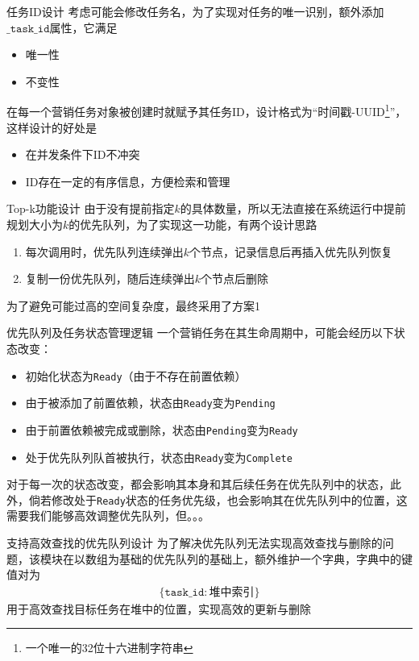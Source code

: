 \documentclass[aspectratio=169]{beamer}
\begin{document}
\begin{frame}{任务ID设计}
    考虑可能会修改任务名，为了实现对任务的唯一识别，额外添加$\mathtt{\_task\_id}$属性，它满足
    \begin{itemize}
        \item 唯一性
        \item 不变性
    \end{itemize}
    在每一个营销任务对象被创建时就赋予其任务ID，设计格式为“时间戳-UUID\footnote{一个唯一的32位十六进制字符串}”，这样设计的好处是
    \begin{itemize}
        \item 在并发条件下ID不冲突
        \item ID存在一定的有序信息，方便检索和管理
    \end{itemize}
\end{frame}

\begin{frame}{Top-k功能设计}
    由于没有提前指定$k$的具体数量，所以无法直接在系统运行中提前规划大小为$k$的优先队列，为了实现这一功能，有两个设计思路
    \begin{enumerate}
        \item 每次调用时，优先队列连续弹出$k$个节点，记录信息后再插入优先队列恢复
        \item 复制一份优先队列，随后连续弹出$k$个节点后删除
    \end{enumerate}
    为了避免可能过高的空间复杂度，最终采用了方案1
\end{frame}

\begin{frame}{优先队列及任务状态管理逻辑}
    一个营销任务在其生命周期中，可能会经历以下状态改变：
    \begin{itemize}
        \item 初始化状态为\texttt{Ready}（由于不存在前置依赖）
        \item 由于被添加了前置依赖，状态由\texttt{Ready}变为\texttt{Pending}
        \item 由于前置依赖被完成或删除，状态由\texttt{Pending}变为\texttt{Ready}
        \item 处于优先队列队首被执行，状态由\texttt{Ready}变为\texttt{Complete}
    \end{itemize}
    对于每一次的状态改变，都会影响其本身和其后续任务在优先队列中的状态，此外，倘若修改处于\texttt{Ready}状态的任务优先级，也会影响其在优先队列中的位置，这需要我们能够高效调整优先队列，但。。。
\end{frame}

\begin{frame}{支持高效查找的优先队列设计}
    为了解决优先队列无法实现高效查找与删除的问题，该模块在以数组为基础的优先队列的基础上，额外维护一个字典，字典中的键值对为
    \begin{align*}
        \{\mathtt{task\_id}: \text{堆中索引}\}
    \end{align*}
    用于高效查找目标任务在堆中的位置，实现高效的更新与删除
\end{frame}
\end{document}
